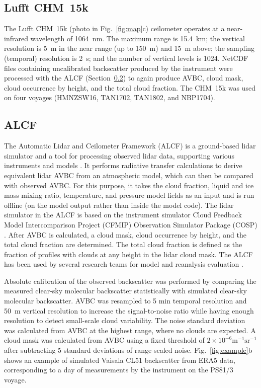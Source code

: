 \documentclass[draft]{agujournal2019}
\begin{document}
\subsection{Lufft CHM~15k}
\label{sec:chm15k}

The Lufft CHM~15k (photo in Fig.~\ref{fig:map}c) ceilometer operates at a near-infrared wavelength of 1064~nm. The maximum range is 15.4~km; the vertical resolution is 5~m in the near range (up to 150~m) and 15~m above; the sampling (temporal) resolution is 2~s; and the number of vertical levels is 1024. NetCDF files containing uncalibrated backscatter produced by the instrument were processed with the ALCF (Section~\ref{sec:alcf}) to again produce AVBC, cloud mask, cloud occurrence by height, and the total cloud fraction. The CHM~15k was used on four voyages (HMNZSW16, TAN1702, TAN1802, and NBP1704).

\subsection{ALCF}
\label{sec:alcf}

The Automatic Lidar and Ceilometer Framework (ALCF) is a ground-based lidar simulator and a tool for processing observed lidar data, supporting various instruments and models \cite{kuma2021}. It performs radiative transfer calculations to derive equivalent lidar AVBC from an atmospheric model, which can then be compared with observed AVBC. For this purpose, it takes the cloud fraction, liquid and ice mass mixing ratio, temperature, and pressure model fields as an input and is run offline (on the model output rather than inside the model code). The lidar simulator in the ALCF is based on the instrument simulator Cloud Feedback Model Intercomparison Project (CFMIP) Observation Simulator Package (COSP) \cite{bodas-salcedo2011}. After AVBC is calculated, a cloud mask, cloud occurrence by height, and the total cloud fraction are determined. The total cloud fraction is defined as the fraction of profiles with clouds at any height in the lidar cloud mask. The ALCF has been used by several research teams for model and reanalysis evaluation \cite{kuma2020,kremser2021,guyot2022,pei2023,whitehead2023,mcdonald2024a}.

Absolute calibration of the observed backscatter was performed by comparing the measured clear-sky molecular backscatter statistically with simulated clear-sky molecular backscatter. AVBC was resampled to 5 min temporal resolution and 50~m vertical resolution to increase the signal-to-noise ratio while having enough resolution to detect small-scale cloud variability. The noise standard deviation was calculated from AVBC at the highest range, where no clouds are expected. A cloud mask was calculated from AVBC using a fixed threshold of $\mathrm{2\times 10^{-6} m^{-1}sr^{-1}}$ after subtracting 5 standard deviations of range-scaled noise. Fig.~\ref{fig:example}b shows an example of simulated Vaisala CL51 backscatter from ERA5 data, corresponding to a day of measurements by the instrument on the PS81/3 voyage.
\end{document}
